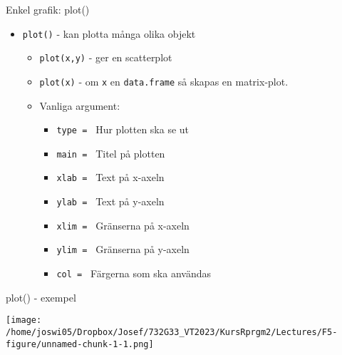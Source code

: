 \documentclass[
  11pt,
  ignorenonframetext,
  handout]{beamer}
\newenvironment{Shaded}{\begin{snugshade}}{\end{snugshade}}
\newcommand{\AttributeTok}[1]{\textcolor[rgb]{0.77,0.63,0.00}{#1}}
\newcommand{\FunctionTok}[1]{\textcolor[rgb]{0.00,0.00,0.00}{#1}}
\newcommand{\NormalTok}[1]{#1}
\newcommand{\SpecialCharTok}[1]{\textcolor[rgb]{0.00,0.00,0.00}{#1}}
\newcommand{\StringTok}[1]{\textcolor[rgb]{0.31,0.60,0.02}{#1}}
\providecommand{\tightlist}{%
  \setlength{\itemsep}{0pt}\setlength{\parskip}{0pt}}
\begin{document}
\begin{frame}{Enkel grafik: plot()}
\protect\hypertarget{enkel-grafik-plot}{}
\begin{itemize}
\tightlist
\item
  \texttt{plot()} - kan plotta många olika objekt

  \begin{itemize}
  \tightlist
  \item
    \texttt{plot(x,y)} - ger en scatterplot
  \item
    \texttt{plot(x)} - om \texttt{x} en \texttt{data.frame} så skapas en
    matrix-plot.
  \item
    Vanliga argument:

    \begin{itemize}
    \tightlist
    \item
      \texttt{type = } Hur plotten ska se ut
    \item
      \texttt{main = } Titel på plotten
    \item
      \texttt{xlab = } Text på x-axeln
    \item
      \texttt{ylab = } Text på y-axeln
    \item
      \texttt{xlim = } Gränserna på x-axeln
    \item
      \texttt{ylim = } Gränserna på y-axeln
    \item
      \texttt{col = } Färgerna som ska användas
    \end{itemize}
  \end{itemize}
\end{itemize}
\end{frame}

\begin{frame}[fragile]{plot() - exempel}
\protect\hypertarget{plot---exempel}{}
\begin{Shaded}
\end{Shaded}

\texttt{[image: /home/joswi05/Dropbox/Josef/732G33\_VT2023/KursRprgm2/Lectures/F5-figure/unnamed-chunk-1-1.png]}
\end{frame}
\end{document}
